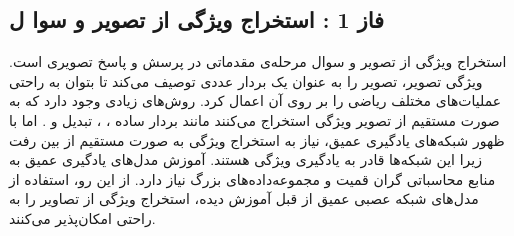 \subsection{فاز 1 : استخراج ویژگی از تصویر و سوا ل} \label{sec:extract}

		استخراج ویژگی از تصویر و سوال مرحله‌ی مقدماتی در پرسش و پاسخ تصویری است. ویژگی تصویر، تصویر را به عنوان یک بردار عددی  توصیف می‌کند تا بتوان به راحتی عملیات‌های مختلف ریاضی را بر روی آن اعمال کرد. روش‌های زیادی وجود دارد که به صورت مستقیم از تصویر ویژگی استخراج می‌کنند مانند بردار ساده 
		،
		، تبدیل
		و 
		.
		اما با ظهور شبکه‌های یادگیری عمیق، نیاز به استخراج ویژگی به صورت مستقیم از بین رفت زیرا این شبکه‌ها قادر به یادگیری ویژگی هستند. آموزش مدل‌های یادگیری عمیق به منابع محاسباتی گران قمیت و مجموعه‌داده‌های بزرگ نیاز دارد. از این رو، استفاده از مدل‌های شبکه عصبی عمیق از قبل آموزش دیده، استخراج ویژگی‌ از تصاویر را به راحتی امکان‌پذیر می‌کنند. 
		
